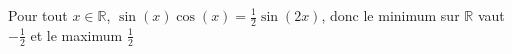 Pour tout $x\in\mathbb{R}$, $\sin(x)\cos(x)=\frac{1}{2}\sin(2x)$, donc le minimum sur $\mathbb{R}$ vaut $-\frac{1}{2}$ et le maximum $\frac{1}{2}$
